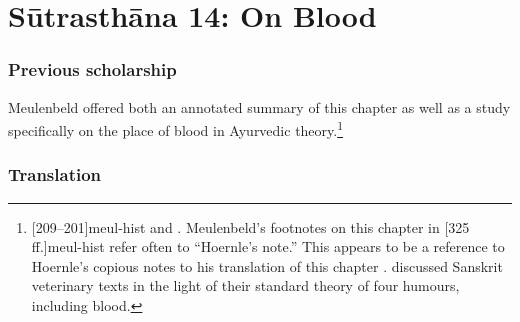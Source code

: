 
\chapter{Sūtrasthāna 14:  On Blood}


\subsection{Previous scholarship}

Meulenbeld offered both an annotated summary of this chapter as well as a
 study specifically on the place of blood
in Ayurvedic theory.\footnote{[209--201]{meul-hist}  and  \cite{meul-1991}.  Meulenbeld's footnotes on this chapter in [325\,ff.]{meul-hist} refer often to ``Hoernle's note.''  This appears to be a reference to Hoernle's copious notes to his translation of this chapter \citep[87--98]{hoer-1897}. \citet{meul-1990} 
    discussed Sanskrit veterinary texts in the light of their standard theory of four 
    humours, including blood.}

\subsection{Translation}

